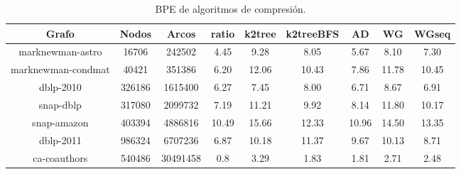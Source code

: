 \begin{table}
	\caption{BPE de algoritmos de compresión.}
	\label{table:BPEcomp}
	\centering
	\begin{tabular}{c|c|c|c|c|c|c|c|c}
		Grafo & Nodos & Arcos & ratio & k2tree & k2treeBFS & AD & WG & WGseq\\
		\toprule
		marknewman-astro & 16706 & 242502 & 4.45 & 9.28 & 8.05 & 5.67 & 8.10 & 7.30\\
		marknewman-condmat & 40421 & 351386 & 6.20 & 12.06 & 10.43 & 7.86 & 11.78 & 10.45\\
		dblp-2010 & 326186 & 1615400 & 6.27 & 7.45 & 8.00 & 6.71 & 8.67 & 6.91 \\
		snap-dblp & 317080 & 2099732 & 7.19 & 11.21 & 9.92 & 8.14 & 11.80 & 10.17 \\
         snap-amazon & 403394 & 4886816 & 10.49 & 15.66 & 12.33 & 10.96 & 14.50 & 13.35 \\
         dblp-2011 & 986324 & 6707236 & 6.87 & 10.18 & 11.37 & 9.67 & 10.13 & 8.71 \\
         ca-coauthors & 540486 & 30491458 & 0.8 & 3.29 & 1.83 & 1.81 & 2.71 & 2.48 \\
	\end{tabular}
\end{table}
